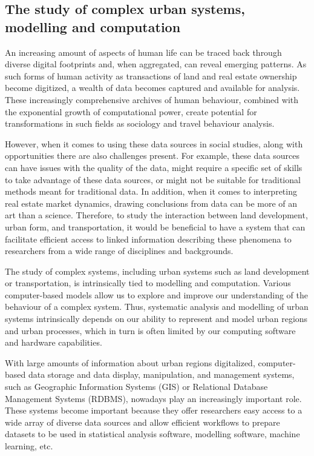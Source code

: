\subsection{The study of complex urban systems, modelling and computation} \label{subsec:study_of_complex_urban_systems_modelling_computation}

An increasing amount of aspects of human life can be traced back through diverse digital footprints and, when aggregated, can reveal emerging patterns.\cite{Arribas-Bel2014}
As such forms of human activity as transactions of land and real estate ownership become digitized\cite{TeranetEnterprisesInc.}, a wealth of data becomes captured and available for analysis.
These increasingly comprehensive archives of human behaviour, combined with the exponential growth of computational power, create potential for transformations in such fields as sociology\cite{Lazer2017} and travel behaviour analysis\cite{Chen2016}.

However, when it comes to using these data sources in social studies, along with opportunities there are also challenges present.
For example, these data sources can have issues with the quality of the data, might require a specific set of skills to take advantage of these data sources, or might not be suitable for traditional methods meant for traditional data\cite{Arribas-Bel2014}.
In addition, when it comes to interpreting real estate market dynamics, drawing conclusions from data can be more of an art than a science.\cite{Brett2009}
Therefore, to study the interaction between land development, urban form, and transportation, it would be beneficial to have a system that can facilitate efficient access to linked information describing these phenomena to researchers from a wide range of disciplines and backgrounds.

The study of complex systems, including urban systems such as land development or transportation, is intrinsically tied to modelling and computation.
Various computer-based models allow us to explore and improve our understanding of the behaviour of a complex system.
Thus, systematic analysis and modelling of urban systems intrinsically depends on our ability to represent and model urban regions and urban processes, which in turn is often limited by our computing software and hardware capabilities.

With large amounts of information about urban regions digitalized\cite{TeranetEnterprisesInc.}, computer-based data storage and data display, manipulation, and management systems, such as Geographic Information Systems (GIS) or Relational Database Management Systems (RDBMS), nowadays play an increasingly important role.
These systems become important because they offer researchers easy access to a wide array of diverse data sources and allow efficient workflows to prepare datasets to be used in statistical analysis software, modelling software, machine learning, etc.

